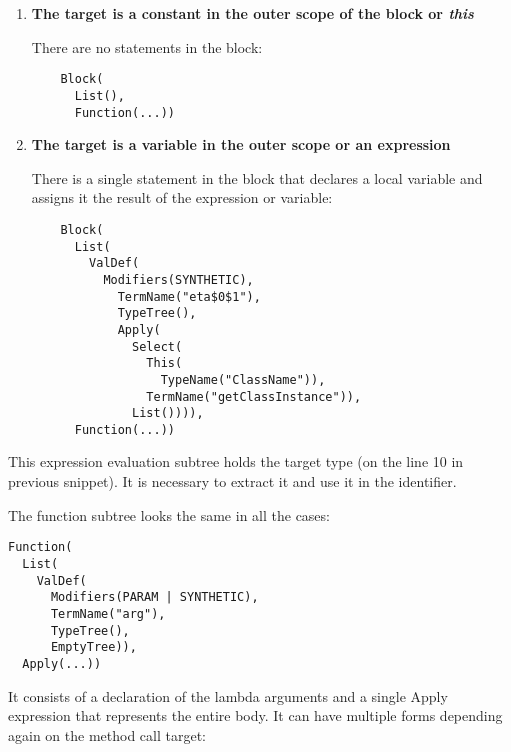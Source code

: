\begin{enumerate}
	\item \textbf{The target is a constant in the outer scope of the block or \textit{this}}
	
	There are no statements in the block:
	\begin{lstlisting}
	Block(
	  List(), 
	  Function(...))
	\end{lstlisting}
	\item \textbf{The target is a variable in the outer scope or an expression}
	
	There is a single statement in the block that declares a local variable and assigns it the result of the expression or variable:
	
	\begin{lstlisting}
	Block(
	  List(
	    ValDef(
	      Modifiers(SYNTHETIC), 
	        TermName("eta$0$1"), 
	        TypeTree(), 
	        Apply(
	          Select(
	            This(
	              TypeName("ClassName")), 
	            TermName("getClassInstance")), 
	          List()))), 
	  Function(...))
	\end{lstlisting}
\end{enumerate}

This expression evaluation subtree holds the target type (on the line 10 in previous snippet). It is necessary to extract it and use it in the identifier.

The function subtree looks the same in all the cases:

\begin{lstlisting}
Function(
  List(
    ValDef(
      Modifiers(PARAM | SYNTHETIC), 
      TermName("arg"), 
      TypeTree(), 
      EmptyTree)), 
  Apply(...))
\end{lstlisting}

It consists of a declaration of the lambda arguments and a single Apply expression that represents the entire body. It can have multiple forms depending again on the method call target:

